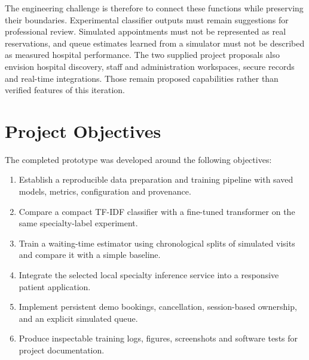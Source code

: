 \documentclass{tietreport}
\begin{document}
The engineering challenge is therefore to connect these functions while preserving their boundaries. Experimental classifier outputs must remain suggestions for professional review. Simulated appointments must not be represented as real reservations, and queue estimates learned from a simulator must not be described as measured hospital performance. The two supplied project proposals also envision hospital discovery, staff and administration workspaces, secure records and real-time integrations. Those remain proposed capabilities rather than verified features of this iteration.

\section{Project Objectives}
The completed prototype was developed around the following objectives:
\begin{enumerate}
\item Establish a reproducible data preparation and training pipeline with saved models, metrics, configuration and provenance.
\item Compare a compact TF-IDF classifier with a fine-tuned transformer on the same specialty-label experiment.
\item Train a waiting-time estimator using chronological splits of simulated visits and compare it with a simple baseline.
\item Integrate the selected local specialty inference service into a responsive patient application.
\item Implement persistent demo bookings, cancellation, session-based ownership, and an explicit simulated queue.
\item Produce inspectable training logs, figures, screenshots and software tests for project documentation.
\end{enumerate}
\end{document}
